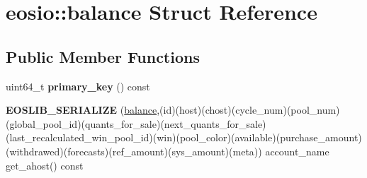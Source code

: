 \hypertarget{structeosio_1_1balance}{}\section{eosio\+:\+:balance Struct Reference}
\label{structeosio_1_1balance}
\subsection*{Public Member Functions}
\begin{DoxyCompactItemize}
\item 
\mbox{\label{structeosio_1_1balance_a61bf7990c26d6f28f6507e1fd2c56e44}} 
uint64\+\_\+t {\bfseries primary\+\_\+key} () const
\item 
\mbox{\label{structeosio_1_1balance_a96459a06290ab3bbcbcee477c8805bea}} 
{\bfseries E\+O\+S\+L\+I\+B\+\_\+\+S\+E\+R\+I\+A\+L\+I\+ZE} (\mbox{\hyperlink{structeosio_1_1balance}{balance}},(id)(host)(chost)(cycle\+\_\+num)(pool\+\_\+num)(global\+\_\+pool\+\_\+id)(quants\+\_\+for\+\_\+sale)(next\+\_\+quants\+\_\+for\+\_\+sale)(last\+\_\+recalculated\+\_\+win\+\_\+pool\+\_\+id)(win)(pool\+\_\+color)(available)(purchase\+\_\+amount)(withdrawed)(forecasts)(ref\+\_\+amount)(sys\+\_\+amount)(meta)) account\+\_\+name get\+\_\+ahost() const
\end{DoxyCompactItemize}
